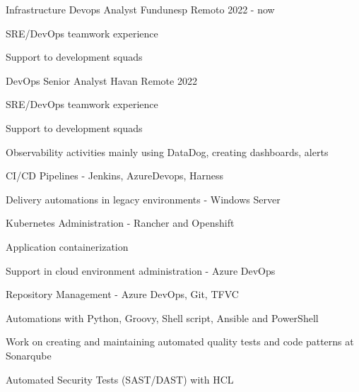 

\begin{cventries}


\cventry
{Infrastructure Devops Analyst} %
{Fundunesp} %
{Remoto} %
{2022 - now} %
{
  \begin{cvitems} %
    \item {SRE/DevOps teamwork experience}
    \item {Support to development squads}
  \end{cvitems}
}

  \cventry
    {DevOps Senior Analyst} %
    {Havan} %
    {Remote} %
    {2022} %
    {
      \begin{cvitems} %
        \item {SRE/DevOps teamwork experience}
        \item {Support to development squads}
        \item {Observability activities mainly using DataDog, creating dashboards, alerts}
        \item {CI/CD Pipelines - Jenkins, AzureDevops, Harness}
        \item {Delivery automations in legacy environments - Windows Server}
        \item {Kubernetes Administration - Rancher and Openshift}
        \item {Application containerization}
        \item {Support in cloud environment administration - Azure DevOps}
        \item {Repository Management - Azure DevOps, Git, TFVC}
        \item {Automations with Python, Groovy, Shell script, Ansible and PowerShell}
        \item {Work on creating and maintaining automated quality tests and code patterns at Sonarqube}
        \item {Automated Security Tests (SAST/DAST) with HCL}
      \end{cvitems}
    }


\end{cventries}
